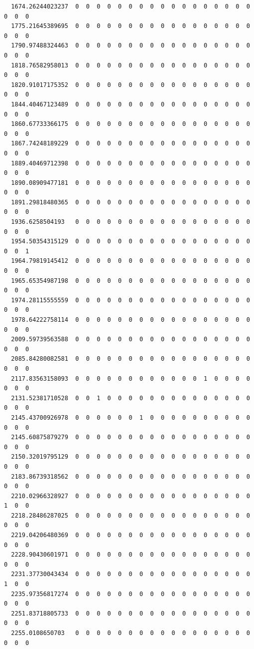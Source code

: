 \documentclass[
  letterpaper,
  DIV=11,
  numbers=noendperiod]{scrartcl}
\begin{document}
\begin{verbatim}
  1674.26244023237  0  0  0  0  0  0  0  0  0  0  0  0  0  0  0  0  0  0  0  0
  1775.21645389695  0  0  0  0  0  0  0  0  0  0  0  0  0  0  0  0  0  0  0  0
  1790.97488324463  0  0  0  0  0  0  0  0  0  0  0  0  0  0  0  0  0  0  0  0
  1818.76582958013  0  0  0  0  0  0  0  0  0  0  0  0  0  0  0  0  0  0  0  0
  1820.91017175352  0  0  0  0  0  0  0  0  0  0  0  0  0  0  0  0  0  0  0  0
  1844.40467123489  0  0  0  0  0  0  0  0  0  0  0  0  0  0  0  0  0  0  0  0
  1860.67733366175  0  0  0  0  0  0  0  0  0  0  0  0  0  0  0  0  0  0  0  0
  1867.74248189229  0  0  0  0  0  0  0  0  0  0  0  0  0  0  0  0  0  0  0  0
  1889.40469712398  0  0  0  0  0  0  0  0  0  0  0  0  0  0  0  0  0  0  0  0
  1890.08909477181  0  0  0  0  0  0  0  0  0  0  0  0  0  0  0  0  0  0  0  0
  1891.29818480365  0  0  0  0  0  0  0  0  0  0  0  0  0  0  0  0  0  0  0  0
  1936.6258504193   0  0  0  0  0  0  0  0  0  0  0  0  0  0  0  0  0  0  0  0
  1954.50354315129  0  0  0  0  0  0  0  0  0  0  0  0  0  0  0  0  0  0  0  1
  1964.79819145412  0  0  0  0  0  0  0  0  0  0  0  0  0  0  0  0  0  0  0  0
  1965.65354987198  0  0  0  0  0  0  0  0  0  0  0  0  0  0  0  0  0  0  0  0
  1974.28115555559  0  0  0  0  0  0  0  0  0  0  0  0  0  0  0  0  0  0  0  0
  1978.64222758114  0  0  0  0  0  0  0  0  0  0  0  0  0  0  0  0  0  0  0  0
  2009.59739563588  0  0  0  0  0  0  0  0  0  0  0  0  0  0  0  0  0  0  0  0
  2085.84280082581  0  0  0  0  0  0  0  0  0  0  0  0  0  0  0  0  0  0  0  0
  2117.83563158093  0  0  0  0  0  0  0  0  0  0  0  0  1  0  0  0  0  0  0  0
  2131.52381710528  0  0  1  0  0  0  0  0  0  0  0  0  0  0  0  0  0  0  0  0
  2145.43700926978  0  0  0  0  0  0  1  0  0  0  0  0  0  0  0  0  0  0  0  0
  2145.60875879279  0  0  0  0  0  0  0  0  0  0  0  0  0  0  0  0  0  0  0  0
  2150.32019795129  0  0  0  0  0  0  0  0  0  0  0  0  0  0  0  0  0  0  0  0
  2183.86739318562  0  0  0  0  0  0  0  0  0  0  0  0  0  0  0  0  0  0  0  0
  2210.02966328927  0  0  0  0  0  0  0  0  0  0  0  0  0  0  0  0  0  1  0  0
  2218.28486287025  0  0  0  0  0  0  0  0  0  0  0  0  0  0  0  0  0  0  0  0
  2219.04206480369  0  0  0  0  0  0  0  0  0  0  0  0  0  0  0  0  0  0  0  0
  2228.90430601971  0  0  0  0  0  0  0  0  0  0  0  0  0  0  0  0  0  0  0  0
  2231.37730043434  0  0  0  0  0  0  0  0  0  0  0  0  0  0  0  0  0  1  0  0
  2235.97356817274  0  0  0  0  0  0  0  0  0  0  0  0  0  0  0  0  0  0  0  0
  2251.83718805733  0  0  0  0  0  0  0  0  0  0  0  0  0  0  0  0  0  0  0  0
  2255.0108650703   0  0  0  0  0  0  0  0  0  0  0  0  0  0  0  0  0  0  0  0

\end{verbatim}
\end{document}
